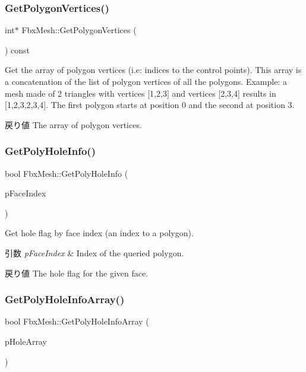 \subsubsection{\texorpdfstring{Get\+Polygon\+Vertices()}{GetPolygonVertices()}}
{\footnotesize\ttfamily int$\ast$ Fbx\+Mesh\+::\+Get\+Polygon\+Vertices (\begin{DoxyParamCaption}{ }\end{DoxyParamCaption}) const}

Get the array of polygon vertices (i.\+e\+: indices to the control points). This array is a concatenation of the list of polygon vertices of all the polygons. Example\+: a mesh made of 2 triangles with vertices \mbox{[}1,2,3\mbox{]} and vertices \mbox{[}2,3,4\mbox{]} results in \mbox{[}1,2,3,2,3,4\mbox{]}. The first polygon starts at position 0 and the second at position 3. \begin{DoxyReturn}{戻り値}
The array of polygon vertices. 
\end{DoxyReturn}
\mbox{\label{class_fbx_mesh_aefe03c32a3743332101cdcbac963d64b}} 
\subsubsection{\texorpdfstring{Get\+Poly\+Hole\+Info()}{GetPolyHoleInfo()}}
{\footnotesize\ttfamily bool Fbx\+Mesh\+::\+Get\+Poly\+Hole\+Info (\begin{DoxyParamCaption}\item[{int}]{p\+Face\+Index }\end{DoxyParamCaption})}

Get hole flag by face index (an index to a polygon). 
\begin{DoxyParams}{引数}
{\em p\+Face\+Index} & Index of the queried polygon. \\
\hline
\end{DoxyParams}
\begin{DoxyReturn}{戻り値}
The hole flag for the given face. 
\end{DoxyReturn}
\mbox{\label{class_fbx_mesh_a8b512771bbaf8243e24e649d253003a3}} 
\subsubsection{\texorpdfstring{Get\+Poly\+Hole\+Info\+Array()}{GetPolyHoleInfoArray()}}
{\footnotesize\ttfamily bool Fbx\+Mesh\+::\+Get\+Poly\+Hole\+Info\+Array (\begin{DoxyParamCaption}\item[{\hyperlink{class_fbx_layer_element_array_template}{Fbx\+Layer\+Element\+Array\+Template}$<$ bool $>$ $\ast$$\ast$}]{p\+Hole\+Array }\end{DoxyParamCaption})}

